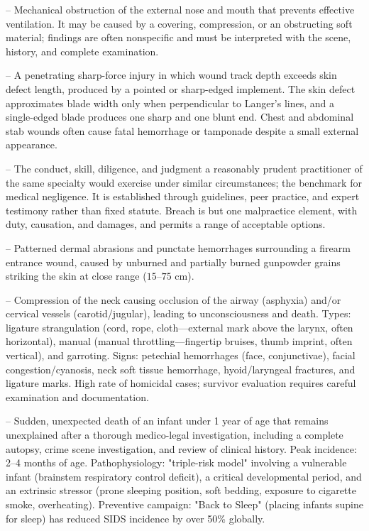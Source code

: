-- Mechanical obstruction of the external nose and mouth that prevents effective ventilation. It may be caused by a covering, compression, or an obstructing soft material; findings are often nonspecific and must be interpreted with the scene, history, and complete examination.

-- A penetrating sharp-force injury in which wound track depth exceeds skin defect length, produced by a pointed or sharp-edged implement. The skin defect approximates blade width only when perpendicular to Langer's lines, and a single-edged blade produces one sharp and one blunt end. Chest and abdominal stab wounds often cause fatal hemorrhage or tamponade despite a small external appearance.

-- The conduct, skill, diligence, and judgment a reasonably prudent practitioner of the same specialty would exercise under similar circumstances; the benchmark for medical negligence. It is established through guidelines, peer practice, and expert testimony rather than fixed statute. Breach is but one malpractice element, with duty, causation, and damages, and permits a range of acceptable options.

-- Patterned dermal abrasions and punctate hemorrhages surrounding a firearm entrance wound, caused by unburned and partially burned gunpowder grains striking the skin at close range ($15\text{--}75\text{ cm}$).

-- Compression of the neck causing occlusion of the airway (asphyxia) and/or cervical vessels (carotid/jugular), leading to unconsciousness and death. Types: ligature strangulation (cord, rope, cloth—external mark above the larynx, often horizontal), manual (manual throttling—fingertip bruises, thumb imprint, often vertical), and garroting. Signs: petechial hemorrhages (face, conjunctivae), facial congestion/cyanosis, neck soft tissue hemorrhage, hyoid/laryngeal fractures, and ligature marks. High rate of homicidal cases; survivor evaluation requires careful examination and documentation.

-- Sudden, unexpected death of an infant under 1 year of age that remains unexplained after a thorough medico-legal investigation, including a complete autopsy, crime scene investigation, and review of clinical history. Peak incidence: 2--4 months of age. Pathophysiology: "triple-risk model" involving a vulnerable infant (brainstem respiratory control deficit), a critical developmental period, and an extrinsic stressor (prone sleeping position, soft bedding, exposure to cigarette smoke, overheating). Preventive campaign: "Back to Sleep" (placing infants supine for sleep) has reduced SIDS incidence by over 50\% globally.

